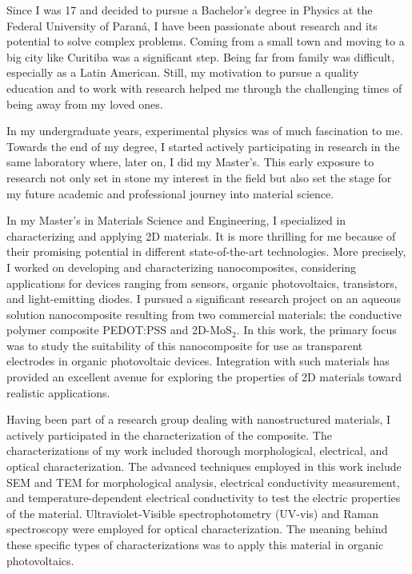 \documentclass{article}
\begin{document}

Since I was 17 and decided to pursue a Bachelor's degree in Physics at the Federal University of Paraná, I have been passionate about research and its potential to solve complex problems. Coming from a small town and moving to a big city like Curitiba was a significant step. Being far from family was difficult, especially as a Latin American. Still, my motivation to pursue a quality education and to work with research helped me through the challenging times of being away from my loved ones.

In my undergraduate years, experimental physics was of much fascination to me. Towards the end of my degree, I started actively participating in research in the same laboratory where, later on, I did my Master's. This early exposure to research not only set in stone my interest in the field but also set the stage for my future academic and professional journey into material science.

In my Master's in Materials Science and Engineering, I specialized in characterizing and applying 2D materials. It is more thrilling for me because of their promising potential in different state-of-the-art technologies. More precisely, I worked on developing and characterizing nanocomposites, considering applications for devices ranging from sensors, organic photovoltaics, transistors, and light-emitting diodes. I pursued a significant research project on an aqueous solution nanocomposite resulting from two commercial materials: the conductive polymer composite PEDOT:PSS and 2D-MoS$_2$. In this work, the primary focus was to study the suitability of this nanocomposite for use as transparent electrodes in organic photovoltaic devices. Integration with such materials has provided an excellent avenue for exploring the properties of 2D materials toward realistic applications.

Having been part of a research group dealing with nanostructured materials, I actively participated in the characterization of the composite. The characterizations of my work included thorough morphological, electrical, and optical characterization. The advanced techniques employed in this work include SEM and TEM for morphological analysis, electrical conductivity measurement, and temperature-dependent electrical conductivity to test the electric properties of the material. Ultraviolet-Visible spectrophotometry (UV-vis) and Raman spectroscopy were employed for optical characterization. The meaning behind these specific types of characterizations was to apply this material in organic photovoltaics.
\end{document}

